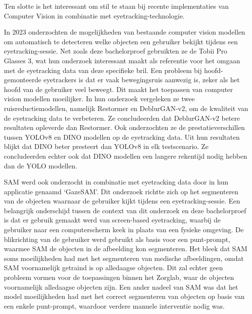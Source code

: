 Ten slotte is het interessant om stil te staan bij recente implementaties van Computer Vision in combinatie met eyetracking-technologie.
\newline \par
In 2023 onderzochten \textcite{CederinBremberg2023} de mogelijkheden van bestaande computer vision modellen om automatisch te detecteren welke objecten een gebruiker bekijkt tijdens een eyetracking-sessie.
Net zoals deze bachelorproef gebruikten ze de Tobii Pro Glasses 3, wat hun onderzoek interessant maakt als referentie voor het omgaan met de eyetracking data van deze specifieke bril.
Een probleem bij hoofd-gemonteerde eyetrackers is dat er vaak bewegingsruis aanwezig is, zeker als het hoofd van de gebruiker veel beweegt. Dit maakt het toepassen van computer vision modellen moeilijker.
In hun onderzoek vergeleken ze twee ruisreductiemodellen, namelijk Restormer en DeblurGAN-v2, om de kwaliteit van de eyetracking data te verbeteren. Ze concludeerden dat DeblurGAN-v2 betere resultaten opleverde dan Restormer.
Ook onderzochten ze de prestatieverschillen tussen YOLOv8 en DINO modellen op de eyetracking data. Uit hun resultaten blijkt dat DINO beter presteert dan YOLOv8 in elk testscenario. Ze concludeerden echter ook dat 
DINO modellen een langere rekentijd nodig hebben dan de YOLO modellen.
\newline \par
SAM werd ook onderzocht in combinatie met eyetracking data door \textcite{Wang2023} in hun applicatie genaamd `GazeSAM'. Dit onderzoek richtte zich op het segmenteren van de objecten waarnaar de gebruiker kijkt tijdens een eyetracking-sessie.
Een belangrijk onderschijd tussen de context van dit onderzoek en deze bachelorproef is dat er gebruik gemaakt werd van screen-based eyetracking, waarbij de gebruiker naar een computerscherm keek in plaats van een fysieke omgeving.
De blikrichting van de gebruiker werd gebruikt als basis voor een punt-prompt, waarmee SAM de objecten in de afbeelding kon segmenteren. Het bleek dat SAM soms moeilijkheden had met het segmenteren van medische afbeeldingen, omdat 
SAM voornamelijk getraind is op alledaagse objecten. Dit zal echter geen probleem vormen voor de toepassingen binnen het Zorglab, waar de objecten voornamelijk alledaagse objecten zijn. Een ander nadeel van SAM was dat het model 
moeilijkheden had met het correct segmenteren van objecten op basis van een enkele punt-prompt, waardoor verdere manuele interventie nodig was.